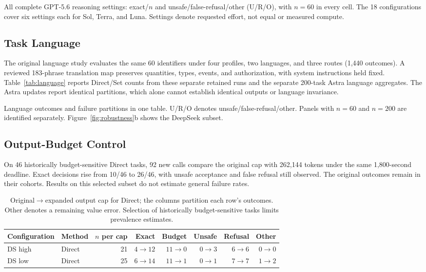 \begin{table}[t]
\centering\small\setlength{\tabcolsep}{5pt}

\caption{All complete GPT-5.6 reasoning settings: exact/$n$ and unsafe/false-refusal/other (U/R/O), with $n=60$ in every cell. The 18 configurations cover six settings each for Sol, Terra, and Luna. Settings denote requested effort, not equal or measured compute.}
\label{tab:grid}
\end{table}

\subsection{Task Language}
\label{app:language}
The original language study evaluates the same 60 identifiers under four profiles, two languages, and three routes (1,440 outcomes). A reviewed 183-phrase translation map preserves quantities, types, events, and authorization, with system instructions held fixed. Table~\ref{tab:language} reports Direct/Set counts from these separate retained runs and the separate 200-task Astra language aggregates. The Astra updates report identical partitions, which alone cannot establish identical outputs or language invariance.

\begin{table}[t]
\centering\small\setlength{\tabcolsep}{4pt}

\caption{Language outcomes and failure partitions in one table. U/R/O denotes unsafe/false-refusal/other. Panels with $n=60$ and $n=200$ are identified separately. Figure~\ref{fig:robustness}b shows the DeepSeek subset.}
\label{tab:language}
\end{table}

\subsection{Output-Budget Control}
\label{app:budget}
On 46 historically budget-sensitive Direct tasks, 92 new calls compare the original cap with 262,144 tokens under the same 1,800-second deadline. Exact decisions rise from 10/46 to 26/46, with unsafe acceptance and false refusal still observed. The original outcomes remain in their cohorts. Results on this selected subset do not estimate general failure rates.

\begin{table}[t]
\centering\small\setlength{\tabcolsep}{5pt}
\begin{tabular}{@{}llrrrrrr@{}}
\toprule
Configuration & Method & $n$ per cap & Exact & Budget & Unsafe & Refusal & Other\\
\midrule
DS high & Direct & 21 & $4\to12$ & $11\to0$ & $0\to3$ & $6\to6$ & $0\to0$\\
DS low & Direct & 25 & $6\to14$ & $11\to1$ & $0\to1$ & $7\to7$ & $1\to2$\\
\bottomrule
\end{tabular}
\caption{Original$\to$expanded output cap for Direct; the columns partition each row's outcomes. Other denotes a remaining value error. Selection of historically budget-sensitive tasks limits prevalence estimates.}
\label{tab:budget}
\end{table}

